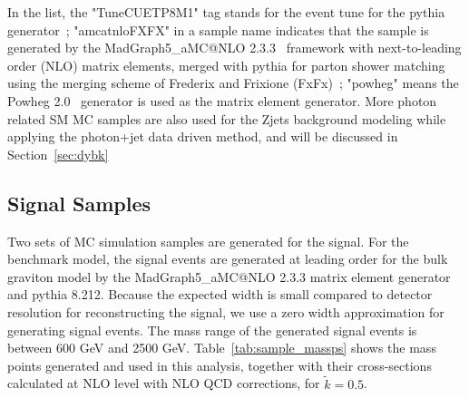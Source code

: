 In the list, the "TuneCUETP8M1" tag stands for the event tune for the pythia generator~\cite{sample_pythiatune}; "amcatnloFXFX" in a sample name indicates that the sample is generated by the MadGraph5\_aMC@NLO 2.3.3~\cite{sample_amcatnlo} framework with next-to-leading order (NLO) matrix elements, merged with pythia for parton shower matching using the merging scheme of Frederix and Frixione (FxFx)~\cite{sample_fxfx}; "powheg" means the Powheg 2.0~\cite{sample_powheg} generator is used as the matrix element generator. More photon related SM MC samples are also used for the Zjets background modeling while applying the photon+jet data driven method, and will be discussed in Section~\ref{sec:dybk}

\subsection{Signal Samples}
Two sets of MC simulation samples are generated for the signal. For the benchmark model, the signal events are generated at leading order for the bulk graviton model by the MadGraph5\_aMC@NLO 2.3.3 matrix element generator and pythia 8.212. Because the expected width is small compared to detector resolution for reconstructing the signal, we use a zero width approximation for generating signal events. The mass range of the generated signal events is between 600 GeV and 2500 GeV. Table~\ref{tab:sample_massps} shows the mass points generated and used in this analysis, together with their cross-sections calculated at NLO level with NLO QCD corrections, for $\tilde{k}=0.5$.

